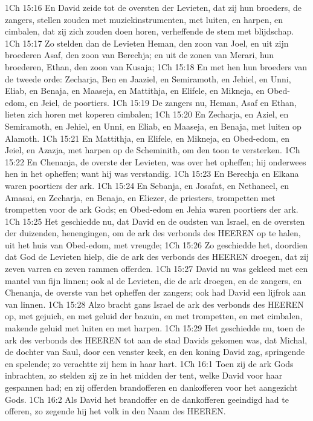 1Ch 15:16  En David zeide tot de oversten der Levieten, dat zij hun broeders, de zangers, stellen zouden met muziekinstrumenten, met luiten, en harpen, en cimbalen, dat zij zich zouden doen horen, verheffende de stem met blijdschap.
1Ch 15:17  Zo stelden dan de Levieten Heman, den zoon van Joel, en uit zijn broederen Asaf, den zoon van Berechja; en uit de zonen van Merari, hun broederen, Ethan, den zoon van Kusaja;
1Ch 15:18  En met hen hun broeders van de tweede orde: Zecharja, Ben en Jaaziel, en Semiramoth, en Jehiel, en Unni, Eliab, en Benaja, en Maaseja, en Mattithja, en Elifele, en Mikneja, en Obed-edom, en Jeiel, de poortiers.
1Ch 15:19  De zangers nu, Heman, Asaf en Ethan, lieten zich horen met koperen cimbalen;
1Ch 15:20  En Zecharja, en Aziel, en Semiramoth, en Jehiel, en Unni, en Eliab, en Maaseja, en Benaja, met luiten op Alamoth.
1Ch 15:21  En Mattithja, en Elifele, en Mikneja, en Obed-edom, en Jeiel, en Azazja, met harpen op de Scheminith, om den toon te versterken.
1Ch 15:22  En Chenanja, de overste der Levieten, was over het opheffen; hij onderwees hen in het opheffen; want hij was verstandig.
1Ch 15:23  En Berechja en Elkana waren poortiers der ark.
1Ch 15:24  En Sebanja, en Josafat, en Nethaneel, en Amasai, en Zecharja, en Benaja, en Eliezer, de priesters, trompetten met trompetten voor de ark Gods; en Obed-edom en Jehia waren poortiers der ark.
1Ch 15:25  Het geschiedde nu, dat David en de oudsten van Israel, en de oversten der duizenden, henengingen, om de ark des verbonds des HEEREN op te halen, uit het huis van Obed-edom, met vreugde;
1Ch 15:26  Zo geschiedde het, doordien dat God de Levieten hielp, die de ark des verbonds des HEEREN droegen, dat zij zeven varren en zeven rammen offerden.
1Ch 15:27  David nu was gekleed met een mantel van fijn linnen; ook al de Levieten, die de ark droegen, en de zangers, en Chenanja, de overste van het opheffen der zangers; ook had David een lijfrok aan van linnen.
1Ch 15:28  Alzo bracht gans Israel de ark des verbonds des HEEREN op, met gejuich, en met geluid der bazuin, en met trompetten, en met cimbalen, makende geluid met luiten en met harpen.
1Ch 15:29  Het geschiedde nu, toen de ark des verbonds des HEEREN tot aan de stad Davids gekomen was, dat Michal, de dochter van Saul, door een venster keek, en den koning David zag, springende en spelende; zo verachtte zij hem in haar hart.
1Ch 16:1  Toen zij de ark Gods inbrachten, zo stelden zij ze in het midden der tent, welke David voor haar gespannen had; en zij offerden brandofferen en dankofferen voor het aangezicht Gods.
1Ch 16:2  Als David het brandoffer en de dankofferen geeindigd had te offeren, zo zegende hij het volk in den Naam des HEEREN.
